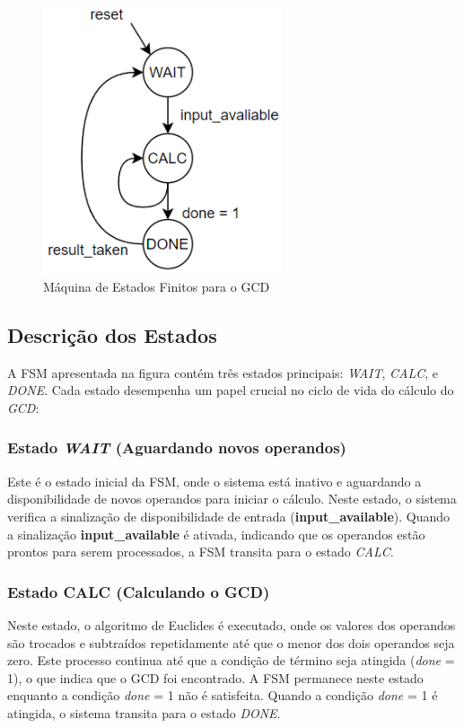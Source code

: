 \documentclass[a4paper,11pt]{article} %
\begin{document}
\begin{figure}[ht]
    \centering
    \includegraphics[width=7cm,angle=0]{imgs/state_machine_GCD.png}
    \caption{Máquina de Estados Finitos para o GCD}
    \label{fig:fsm}
\end{figure}

\subsection{Descrição dos Estados}
A FSM apresentada na figura contém três estados principais:
\textit{WAIT}, \textit{CALC}, e \textit{DONE}. Cada estado desempenha um papel crucial
no ciclo de vida do cálculo do \textit{GCD}:
\subsubsection{Estado \textit{WAIT} (Aguardando novos operandos)}
Este é o estado inicial da FSM, onde o sistema está inativo e
aguardando a disponibilidade de novos operandos para iniciar o
cálculo. Neste estado, o sistema verifica a sinalização de
disponibilidade de entrada (\textbf{input\_available}). Quando
a sinalização \textbf{input\_available} é ativada, indicando que
os operandos estão prontos para serem processados, a FSM
transita para o estado \textit{CALC}.

\subsubsection{Estado CALC (Calculando o GCD)}
Neste estado, o algoritmo de Euclides é executado, onde
os valores dos operandos são trocados e subtraídos
repetidamente até que o menor dos dois operandos seja zero.
Este processo continua até que a condição de término seja
atingida (\textit{done} = 1), o que indica que o GCD foi encontrado.
A FSM permanece neste estado enquanto a condição \textit{done} = 1
não é satisfeita. Quando a condição \textit{done} = 1 é atingida,
o sistema transita para o estado \textit{DONE}.
\end{document}
